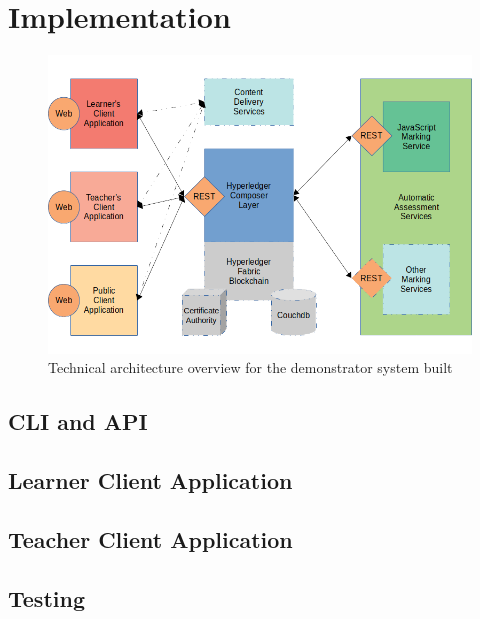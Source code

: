 \chapter{Implementation}

\graphicspath{{Chapter6/Figs/Raster/}{Chapter6/Figs/PDF/}{Chapter6/Figs/}}

\begin{figure}[!ht] 
    \centering    
    \includegraphics[width=1.0\textwidth]{architecture}
    \caption[Technical architecture overview for the demonstrator system built]
        {Technical architecture overview for the demonstrator system built}
    \label{fig:architecture}
\end{figure} 


\section{CLI and API}

\section{Learner Client Application}

\section{Teacher Client Application}

\section{Testing}